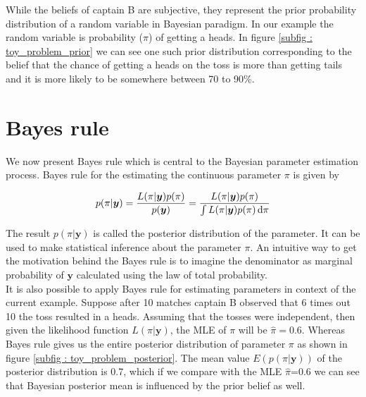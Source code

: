 While the beliefs of captain B are subjective, they represent the prior probability distribution of a random variable in Bayesian paradigm. In our example the random variable is probability ($\pi$) of getting a heads. In figure \ref{subfig : toy_problem_prior} we can see one such prior distribution corresponding to the belief that the chance of getting a heads on the toss is more than getting tails and it is more likely to be somewhere between 70 to 90\%.

\section{Bayes rule}
\label{sec : bayes_rule}
We now present Bayes rule which is central to the Bayesian parameter estimation process. Bayes rule for the estimating the continuous parameter $\pi$ is given by

\begin{equation}
\label{eq : bayes_rule}
p(\pi|\boldsymbol{y}) = \dfrac{L(\pi|\boldsymbol{y})p(\pi)}{p(\boldsymbol{y})} = \dfrac{L(\pi|\boldsymbol{y})p(\pi)}{\int L(\pi|\boldsymbol{y})p(\pi)\mathop{}\!\mathrm{d}\pi}
\end{equation}

The result $p(\pi|\boldsymbol{y})$ is called the posterior distribution of the parameter. It can be used to make statistical inference about the parameter $\pi$. An intuitive way to get the motivation behind the Bayes rule is to imagine the denominator as marginal probability of $\boldsymbol{y}$ calculated using the law of total probability.\\

It is also possible to apply Bayes rule for estimating parameters in context of the current example. Suppose after 10 matches captain B observed that 6 times out 10 the toss resulted in a heads. Assuming that the tosses were independent, then given the likelihood function $L(\pi|\boldsymbol{y})$, the MLE of $\pi$ will be $\hat{\pi} = 0.6$. Whereas Bayes rule gives us the entire posterior distribution of parameter $\pi$ as shown in figure \ref{subfig : toy_problem_posterior}. The mean value $E(p(\pi|\boldsymbol{y}))$ of the posterior distribution is 0.7, which if we compare with the MLE $\hat{\pi}$=0.6 we can see that Bayesian posterior mean is influenced by the prior belief as well.

